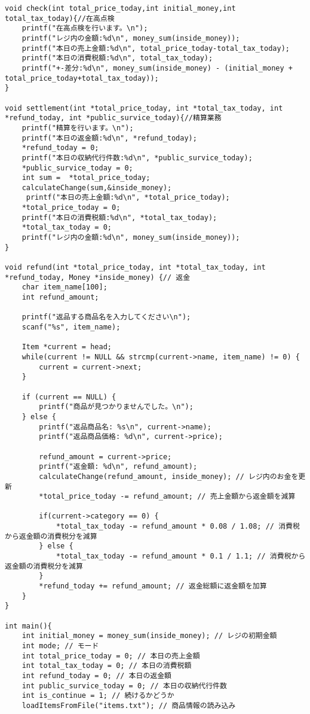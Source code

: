 \documentclass[a4j,11pt]{jarticle}
\begin{document}
\begin{lstlisting}
void check(int total_price_today,int initial_money,int total_tax_today){//在高点検
    printf("在高点検を行います。\n");
    printf("レジ内の金額:%d\n", money_sum(inside_money));
    printf("本日の売上金額:%d\n", total_price_today-total_tax_today);
    printf("本日の消費税額:%d\n", total_tax_today);
    printf("+-差分:%d\n", money_sum(inside_money) - (initial_money + total_price_today+total_tax_today));
}

void settlement(int *total_price_today, int *total_tax_today, int *refund_today, int *public_survice_today){//精算業務
    printf("精算を行います。\n");
    printf("本日の返金額:%d\n", *refund_today);
    *refund_today = 0;
    printf("本日の収納代行件数:%d\n", *public_survice_today);
    *public_survice_today = 0;
    int sum =  *total_price_today;
    calculateChange(sum,&inside_money);
     printf("本日の売上金額:%d\n", *total_price_today);
    *total_price_today = 0;
    printf("本日の消費税額:%d\n", *total_tax_today);
    *total_tax_today = 0;
    printf("レジ内の金額:%d\n", money_sum(inside_money));
}

void refund(int *total_price_today, int *total_tax_today, int *refund_today, Money *inside_money) {// 返金
    char item_name[100];
    int refund_amount;

    printf("返品する商品名を入力してください\n");
    scanf("%s", item_name);

    Item *current = head;
    while(current != NULL && strcmp(current->name, item_name) != 0) {
        current = current->next;
    }

    if (current == NULL) {
        printf("商品が見つかりませんでした。\n");
    } else {
        printf("返品商品名: %s\n", current->name);
        printf("返品商品価格: %d\n", current->price);

        refund_amount = current->price;
        printf("返金額: %d\n", refund_amount);
        calculateChange(refund_amount, inside_money); // レジ内のお金を更新
        *total_price_today -= refund_amount; // 売上金額から返金額を減算

        if(current->category == 0) {
            *total_tax_today -= refund_amount * 0.08 / 1.08; // 消費税から返金額の消費税分を減算
        } else {
            *total_tax_today -= refund_amount * 0.1 / 1.1; // 消費税から返金額の消費税分を減算
        }
        *refund_today += refund_amount; // 返金総額に返金額を加算
    }
}

int main(){
    int initial_money = money_sum(inside_money); // レジの初期金額
    int mode; // モード
    int total_price_today = 0; // 本日の売上金額
    int total_tax_today = 0; // 本日の消費税額
    int refund_today = 0; // 本日の返金額
    int public_survice_today = 0; // 本日の収納代行件数
    int is_continue = 1; // 続けるかどうか
    loadItemsFromFile("items.txt"); // 商品情報の読み込み


\end{lstlisting}
\end{document}
